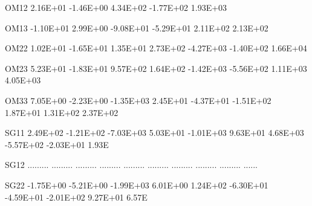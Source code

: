 \documentclass[
  11pt,
  krantz2,
  a4paper]{krantz}
\newenvironment{Shaded}{\begin{snugshade}}{\end{snugshade}}
\newcommand{\FloatTok}[1]{\textcolor[rgb]{0.00,0.00,0.81}{#1}}
\newcommand{\NormalTok}[1]{#1}
\theoremstyle{definition}
\theoremstyle{definition}
\theoremstyle{definition}
\theoremstyle{remark}
\begin{document}
\begin{Shaded}
\begin{Highlighting}[]
\NormalTok{OM12    }\FloatTok{2.16E+01} \FloatTok{{-}1.46E+00}  \FloatTok{4.34E+02} \FloatTok{{-}1.77E+02}  \FloatTok{1.93E+03}                                               
                                                                                                       
\NormalTok{OM13   }\FloatTok{{-}1.10E+01}  \FloatTok{2.99E+00} \FloatTok{{-}9.08E+01} \FloatTok{{-}5.29E+01}  \FloatTok{2.11E+02}  \FloatTok{2.13E+02}                                     
                                                                                                       
\NormalTok{OM22    }\FloatTok{1.02E+01} \FloatTok{{-}1.65E+01}  \FloatTok{1.35E+01}  \FloatTok{2.73E+02} \FloatTok{{-}4.27E+03} \FloatTok{{-}1.40E+02}  \FloatTok{1.66E+04}                           
                                                                                                       
\NormalTok{OM23    }\FloatTok{5.23E+01} \FloatTok{{-}1.83E+01}  \FloatTok{9.57E+02}  \FloatTok{1.64E+02} \FloatTok{{-}1.42E+03} \FloatTok{{-}5.56E+02}  \FloatTok{1.11E+03}  \FloatTok{4.05E+03}                 
                                                                                                       
\NormalTok{OM33    }\FloatTok{7.05E+00} \FloatTok{{-}2.23E+00} \FloatTok{{-}1.35E+03}  \FloatTok{2.45E+01} \FloatTok{{-}4.37E+01} \FloatTok{{-}1.51E+02}  \FloatTok{1.87E+01}  \FloatTok{1.31E+02}  \FloatTok{2.37E+02}       
                                                                                                       
\NormalTok{SG11    }\FloatTok{2.49E+02} \FloatTok{{-}1.21E+02} \FloatTok{{-}7.03E+03}  \FloatTok{5.03E+01} \FloatTok{{-}1.01E+03}  \FloatTok{9.63E+01}  \FloatTok{4.68E+03} \FloatTok{{-}5.57E+02} \FloatTok{{-}2.03E+01}  \FloatTok{1.93}\NormalTok{E}
                                                                                                       
\NormalTok{SG12   ......... ......... ......... ......... ......... ......... ......... ......... ......... ......}
                                                                                                       
\NormalTok{SG22   }\FloatTok{{-}1.75E+00} \FloatTok{{-}5.21E+00} \FloatTok{{-}1.99E+03}  \FloatTok{6.01E+00}  \FloatTok{1.24E+02} \FloatTok{{-}6.30E+01} \FloatTok{{-}4.59E+01} \FloatTok{{-}2.01E+02}  \FloatTok{9.27E+01}  \FloatTok{6.57}\NormalTok{E}
                                                                                                       

\end{Highlighting}
\end{Shaded}
\end{document}
